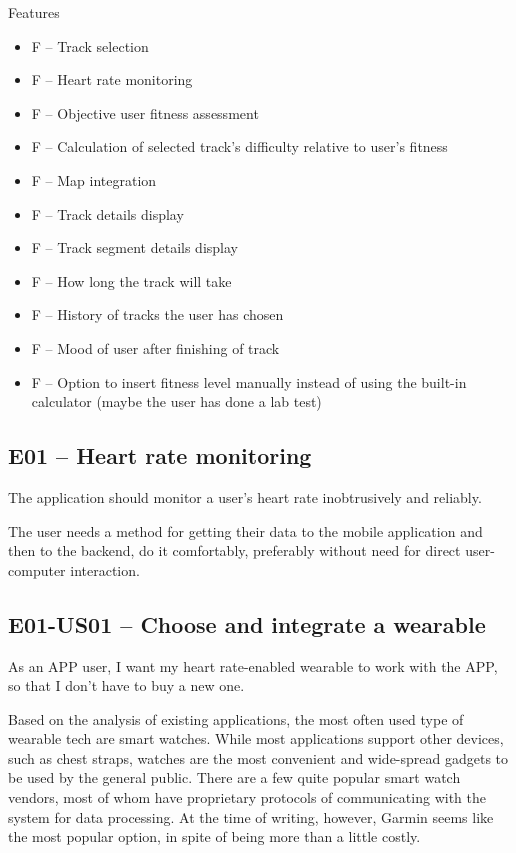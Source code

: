 Features
\begin{itemize}
    \item F -- Track selection
    \item F -- Heart rate monitoring
    \item F -- Objective user fitness assessment
    \item F -- Calculation of selected track's difficulty relative to user's fitness
    \item F -- Map integration
    \item F -- Track details display
    \item F -- Track segment details display
    \item F -- How long the track will take
    \item F -- History of tracks the user has chosen
    \item F -- Mood of user after finishing of track
    \item F -- Option to insert fitness level manually instead of using the built-in calculator (maybe the user has done a lab test)
\end{itemize}

\subsection*{E01 -- Heart rate monitoring}
The application should monitor a user's heart rate inobtrusively and reliably.

The user needs a method for getting their data to the mobile application and then to the backend, do it comfortably, preferably without need for direct user-computer interaction.

\subsection*{E01-US01 -- Choose and integrate a wearable}
As an APP user, I want my heart rate-enabled wearable to work with the APP, so that I don't have to buy a new one.

Based on the analysis of existing applications, the most often used type of wearable tech are smart watches.
While most applications support other devices, such as chest straps, watches are the most convenient and wide-spread gadgets to be used by the general public.
There are a few quite popular smart watch vendors, most of whom have proprietary protocols of communicating with the system for data processing.
At the time of writing, however, Garmin seems like the most popular option, in spite of being more than a little costly.

